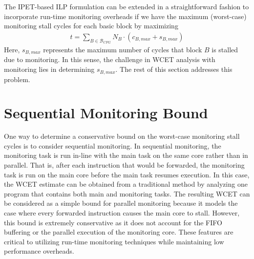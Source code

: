 The IPET-based ILP formulation can be 
extended in a straightforward fashion to incorporate run-time monitoring overheads
if we have the maximum (worst-case) 
monitoring stall cycles for each basic block by maximizing
\begin{align*}
  t = \sum_{B \in \mathcal{B}_{CFG}}{N_{B} \cdot (c_{B,max} + s_{B,max})}
\end{align*}
Here, $s_{B,max}$ represents the maximum number of cycles that block $B$ is stalled 
due to monitoring. In this sense, the challenge in WCET analysis with
monitoring lies in determining $s_{B,max}$. 
The rest of this section addresses this problem.

\section{Sequential Monitoring Bound}
\label{sec:formulation:sequential}

One way to determine a conservative bound on the worst-case monitoring stall cycles 
is to consider sequential monitoring.
In
sequential monitoring, the monitoring task is run in-line with the main task on the same core
rather than in parallel. That is, after each instruction that would be
forwarded, the monitoring task is run on the main core before the main task
resumes execution. In this case, the WCET estimate can be obtained from 
a traditional method by analyzing one program that contains both main and
monitoring tasks.
The resulting WCET can be considered as a simple bound
for parallel monitoring because it models the case where every forwarded 
instruction causes the main core to stall.
However, this bound is
extremely conservative as it does not account for the FIFO buffering or the
parallel execution of the monitoring core. These features are critical to
utilizing run-time monitoring techniques while maintaining low performance
overheads.

